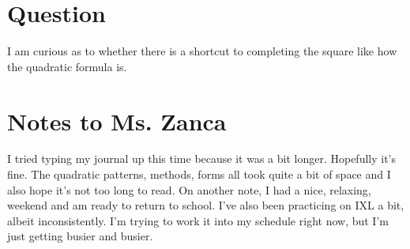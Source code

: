 \documentclass{article}
\begin{document}
	\section{Question}
	I am curious as to whether there is a shortcut to completing the square like how the quadratic formula is.
	
	\section{Notes to Ms. Zanca}
	I tried typing my journal up this time because it was a bit longer. Hopefully it's fine. The quadratic patterns, methods, forms all took quite a bit of space and I also hope it's not too long to read. On another note, I had a nice, relaxing, weekend and am ready to return to school. I've also been practicing on IXL a bit, albeit inconsistently. I'm trying to work it into my schedule right now, but I'm just getting busier and busier.
	
\end{document}
